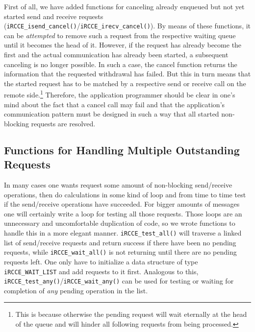 \documentclass[fontsize=10pt, paper=a4, DIV12, pagesize=auto]{scrartcl}
\begin{document}
First of all, we have added functions for canceling already enqueued but not yet started send and receive requests (\texttt{iRCCE\_isend\_cancel()}/\texttt{iRCCE\_irecv\_cancel()}).
By means of these functions, it can be \emph{attempted} to remove such a request from the respective waiting queue until it becomes the head of it.
However, if the request has already become the first and the actual communication has already been started, a subsequent canceling is no longer possible.
In such a case, the cancel function returns the information that the requested withdrawal has failed.
But this in turn means that the started request has to be matched by a respective send or receive call on the remote side.\footnote{This is because otherwise the pending request will wait eternally at the head of the queue and will hinder all following requests from being processed.}
Therefore, the application programmer should be clear in one's mind about the fact that a cancel call may fail and that the application's communication pattern must be designed in such a way that all started non-blocking requests are resolved.

\subsection{Functions for Handling Multiple Outstanding Requests}\label{sec:extended:multiple}

In many cases one wants request some amount of non-blocking send/receive operations, then do calculations in some kind of loop and from time to time test if the send/receive operations have succeeded.
For bigger amounts of messages one will certainly write a loop for testing all those requests. Those loops are an unnecessary and uncomfortable duplication of code, so we wrote functions to handle this in a more elegant manner.
\texttt{iRCCE\_test\_all()} will traverse a linked list of send/receive requests and return success if there have been no pending requests, while \texttt{iRCCE\_wait\_all()} is not returning until there are no pending requests left.
One only have to initialize a data structure of type \texttt{iRCCE\_WAIT\_LIST} and add requests to it first.
Analogous to this, \texttt{iRCCE\_test\_any()}/\texttt{iRCCE\_wait\_any()} can be used for testing or waiting for completion of \emph{any} pending operation in the list.
\end{document}
